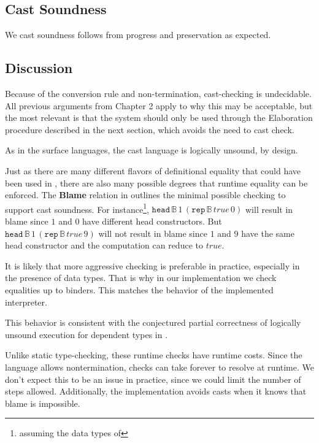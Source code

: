 \subsection{Cast Soundness}
 
 
We cast soundness follows from progress and preservation as expected.
 
 
\subsection{Discussion}
 
 
 
Because of the conversion rule and non-termination, cast-checking is undecidable.
All previous arguments from Chapter 2 apply to why this may be acceptable, but the most relevant is that the system should only be used through the Elaboration procedure described in the next section, which avoids the need to cast check.
 
 
As in the surface languages, the cast language is logically unsound, by design.
 
Just as there are many different flavors of definitional equality that could have been used in , there are also many possible degrees that runtime equality can be enforced.
The \textbf{Blame} relation in  outlines the minimal possible checking to support cast soundness.
For instance\footnote{assuming the data types of }, $\mathtt{head}\,\mathbb{B}\,1\,\left(\mathtt{rep}\,\mathbb{B}\,true\,0\right)$ will result in blame since $1$ and $0$ have different head constructors.
But $\mathtt{head}\,\mathbb{B}\,1\,\left(\mathtt{rep}\,\mathbb{B}\,true\,9\right)$ will not result in blame since $1$ and $9$ have the same head constructor and the computation can reduce to $true$.
 
It is likely that more aggressive checking is preferable in practice, especially in the presence of data types.
That is why in our implementation we check equalities up to binders.
This matches the \cbv{} behavior of the implemented interpreter.
 
This behavior is consistent with the conjectured partial correctness of logically unsound \cbv{} execution for dependent types in \cite{jia2010dependent}.
 
 
Unlike static type-checking, these runtime checks have runtime costs.
Since the language allows nontermination, checks can take forever to resolve at runtime.
We don't expect this to be an issue in practice, since we could limit the number of steps allowed.
Additionally, the implementation avoids casts when it knows that blame is impossible.